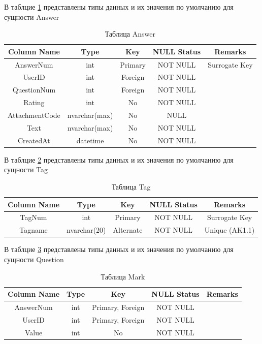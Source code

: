 \documentclass[a4paper, 14pt]{extarticle}
\begin{document}
В таблцие \ref{tab:answer_tab} представлены типы данных и их значения по умолчанию для сущности Answer

\begin{table}[H]
\centering
\caption{Таблица Answer}
\label{tab:answer_tab}
\setlength\extrarowheight{2pt}
\begin{tabular}{|c|c|c|c|c|}
\hline
\textbf{Column Name} & \textbf{Type} & \textbf{Key} & \textbf{NULL Status} & \textbf{Remarks} \\
\hline
AnswerNum & int & Primary & NOT NULL & Surrogate Key \\
\hline
UserID & int & Foreign & NOT NULL & \\
\hline
QuestionNum & int & Foreign & NOT NULL & \\
\hline
Rating & int & No & NOT NULL & \\
\hline
AttachmentCode & nvarchar(max) & No & NULL & \\
\hline
Text & nvarchar(max) & No & NOT NULL & \\
\hline
CreatedAt & datetime & No & NOT NULL & \\
\hline
\end{tabular}
\end{table}


В таблцие \ref{tab:tag_tab} представлены типы данных и их значения по умолчанию для сущности Tag

\begin{table}[H]
\centering
\caption{Таблица Tag}
\label{tab:tag_tab}
\setlength\extrarowheight{2pt}
\begin{tabular}{|c|c|c|c|c|}
\hline
\textbf{Column Name} & \textbf{Type} & \textbf{Key} & \textbf{NULL Status} & \textbf{Remarks} \\
\hline
TagNum & int & Primary & NOT NULL & Surrogate Key \\
\hline
Tagname & nvarchar(20) & Alternate & NOT NULL & Unique (AK1.1) \\
\hline
\end{tabular}
\end{table}


В таблцие \ref{tab:mark_tab} представлены типы данных и их значения по умолчанию для сущности Question

\begin{table}[H]
\centering
\caption{Таблица Mark}
\label{tab:mark_tab}
\setlength\extrarowheight{2pt}
\begin{tabular}{|c|c|c|c|c|}
\hline
\textbf{Column Name} & \textbf{Type} & \textbf{Key} & \textbf{NULL Status} & \textbf{Remarks} \\
\hline
AnswerNum & int & Primary, Foreign & NOT NULL & \\
\hline
UserID & int & Primary, Foreign & NOT NULL & \\
\hline
Value & int & No & NOT NULL & \\
\hline
\end{tabular}
\end{table}
\end{document}
